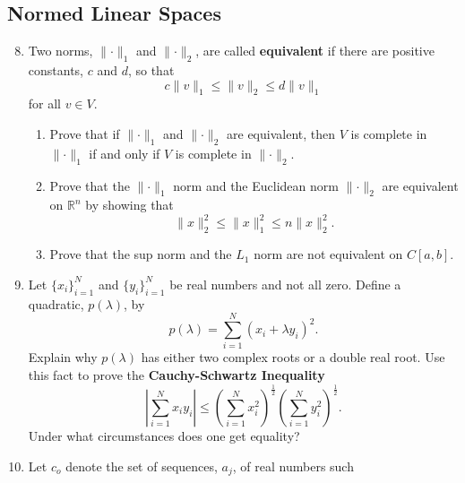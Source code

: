 \documentclass{article}
\begin{document}
\subsection{Normed Linear Spaces}
\begin{enumerate}
      \setcounter{enumi}{7}
      \item Two norms, $\lVert\cdot\rVert_1$ and $\lVert\cdot\rVert_2$, are
            called \textbf{equivalent} if there are positive constants, $c$ and
            $d$, so that
            \[
                  c\lVert v\rVert_1\leq\lVert v\rVert_2\leq d\lVert v\rVert_1
            \]
            for all $v\in V$.
            \begin{enumerate}
                  \item Prove that if $\lVert\cdot\rVert_1$ and
                        $\lVert\cdot\rVert_2$  are equivalent, then $V$ is
                        complete in $\lVert\cdot\rVert_1$ if and only if $V$ is
                        complete in $\lVert\cdot\rVert_2$.
                  \item Prove that the $\lVert\cdot\rVert_1$ norm and the
                        Euclidean norm $\lVert\cdot\rVert_2$ are equivalent on
                        $\mathbb{R}^n$ by showing that
                        \[
                              \lVert x\rVert_2^2
                              \leq \lVert x\rVert_1^2
                              \leq n\lVert x\rVert_2^2.
                        \]
                  \item Prove that the sup norm and the $L_1$ norm are not
                        equivalent on $C[a,b]$.
            \end{enumerate}
            \setcounter{enumi}{9}
      \item Let $\{x_i\}_{i=1}^N$ and $\{y_i\}_{i=1}^N$ be real numbers and not
            all zero. Define a quadratic, $p(\lambda)$, by
            \[
                  p(\lambda)=\sum_{i=1}^N(x_i+\lambda y_i)^2.
            \]
            Explain why $p(\lambda)$ has either two complex roots or a double
            real root. Use this fact to prove the \textbf{Cauchy-Schwartz
                  Inequality}
            \begin{equation}
                  \left\lvert\sum_{i=1}^Nx_iy_i\right\rvert \leq
                  \left(\sum_{i=1}^Nx_i^2\right)^\frac{1}{2}
                  \left(\sum_{i=1}^Ny_i^2\right)^\frac{1}{2}.
            \end{equation}
            Under what circumstances does one get equality?
      \item Let $c_o$ denote the set of sequences, ${a_j}$, of real numbers such

\end{enumerate}
\end{document}
